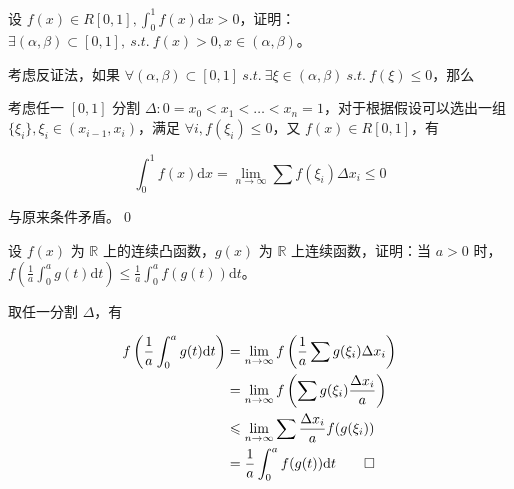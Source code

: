 \begin{ques}
设 $\displaystyle f( x) \in R[ 0,1] ,\int _{0}^{1} f( x)\mathrm{d} x >0$，证明：$\displaystyle \exists ( \alpha ,\beta ) \subset [ 0,1] ,\ s.t.\ f( x)  >0,x\in ( \alpha ,\beta )$。

\end{ques}


考虑反证法，如果 $\displaystyle \forall ( \alpha ,\beta ) \subset [ 0,1] \ s.t.\ \exists \xi \in ( \alpha ,\beta ) \ s.t.\ f( \xi ) \leqslant 0$，那么

考虑任一 $\displaystyle [ 0,1]$ 分割 $\displaystyle \Delta :0=x_{0} < x_{1} < \dotsc < x_{n} =1$，对于根据假设可以选出一组 $\displaystyle \{\xi _{i}\} ,\xi _{i} \in ( x_{i-1} ,x_{i})$，满足 $\displaystyle \forall i,f( \xi _{i}) \leqslant 0$，又 $\displaystyle f( x) \in R[ 0,1]$，有


\begin{equation*}
\int _{0}^{1} f( x)\mathrm{d} x=\lim _{n\rightarrow \infty }\sum f( \xi _{i}) \Delta x_{i} \leqslant 0
\end{equation*}


与原来条件矛盾。\qed 



\begin{ques}
设 $\displaystyle f( x)$ 为 $\displaystyle \mathbb{R}$ 上的连续凸函数，$\displaystyle g( x)$ 为 $\displaystyle \mathbb{R}$ 上连续函数，证明：当 $\displaystyle a >0$ 时，$\displaystyle f\left(\frac{1}{a}\int _{0}^{a} g( t)\mathrm{d} t\right) \leqslant \frac{1}{a}\int _{0}^{a} f( g( t))\mathrm{d} t$。

\end{ques}


取任一分割 $\displaystyle \Delta $，有




\begin{equation*}
\begin{aligned}
f\left(\frac{1}{a}\int _{0}^{a} g( t)\mathrm{d} t\right) & =\lim _{n\rightarrow \infty } f\left(\frac{1}{a}\sum g( \xi _{i}) \Delta x_{i}\right)\\
 & =\lim _{n\rightarrow \infty } f\left(\sum g( \xi _{i})\frac{\Delta x_{i}}{a}\right)\\
 & \leqslant \lim _{n\rightarrow \infty }\sum \frac{\Delta x_{i}}{a} f( g( \xi _{i}))\\
 & =\frac{1}{a}\int _{0}^{a} f( g( t))\mathrm{d} t\qed 
\end{aligned}
\end{equation*}





\ifx\allfiles\undefined

\fi